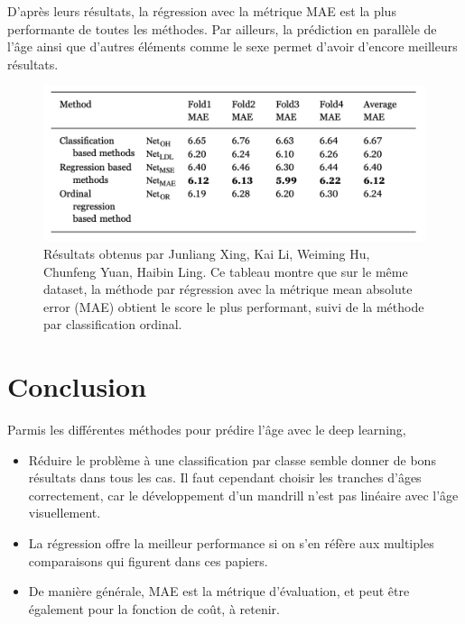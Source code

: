 \documentclass{article}
\begin{document}
D'après leurs résultats, la régression avec la métrique MAE est la plus performante de toutes les méthodes. Par ailleurs, la prédiction en parallèle de l'âge ainsi que d'autres éléments comme le sexe permet d'avoir d'encore meilleurs résultats.
\begin{figure}
    \centering
    \includegraphics[width=345pt]{imgs/qualité/bibliothèque/result.png}
    \caption{Résultats obtenus par Junliang Xing, Kai Li, Weiming Hu, Chunfeng Yuan, Haibin Ling. Ce tableau montre que sur le même dataset, la méthode par régression avec la métrique mean absolute error (MAE) obtient le score le plus performant, suivi de la méthode par classification ordinal.}
    \label{fig:my_label}
\end{figure}


\section{Conclusion}

Parmis les différentes méthodes pour prédire l'âge avec le deep learning,
\begin{itemize}
    \item Réduire le problème à une classification par classe semble donner de bons résultats dans tous les cas. Il faut cependant choisir les tranches d'âges correctement, car le développement d'un mandrill n'est pas linéaire avec l'âge visuellement.
    \item La régression offre la meilleur performance si on s'en réfère aux multiples comparaisons qui figurent dans ces papiers.
    \item De manière générale, MAE est la métrique d'évaluation, et peut être également pour la fonction de coût, à retenir.
\end{itemize}
\end{document}
